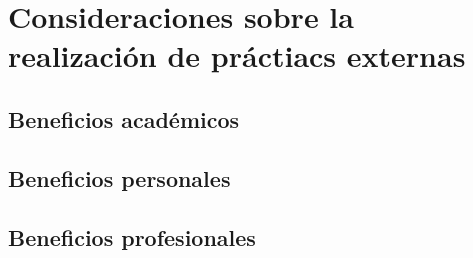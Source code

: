\chapter{Consideraciones sobre la realización de práctiacs externas}
\label{sec:consideraciones}

\section{Beneficios académicos}
\label{subsec:ben-academic}

\section{Beneficios personales}
\label{subsec:ben-pers}

\section{Beneficios profesionales}
\label{subsec:ben-prof}
